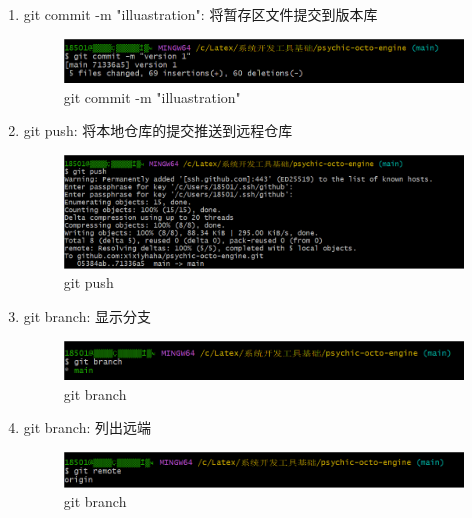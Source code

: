 \documentclass{ctexart}
\begin{document}
\begin{enumerate}
  \vspace{-5pt}\item git commit -m "illuastration": 将暂存区文件提交到版本库
   \begin{figure}[H]
      \centering
      \includegraphics[width=18cm]{b471598ff20a910bccfd0abfd541bcef.png}
      \caption{git commit -m "illuastration"}
      \label{fig:17}
  \end{figure}

  \vspace{-5pt}\item git push: 将本地仓库的提交推送到远程仓库
   \begin{figure}[H]
      \centering
      \includegraphics[width=16cm]{4ffbfc1437dd891758904bd297c85946.png}
      \caption{git push}
      \label{fig:18}
  \end{figure}
  \vspace{-5pt}\item git branch: 显示分支
   \begin{figure}[H]
      \centering
      \includegraphics[width=18cm]{3671d9519684f17b9b96eaeca6db42e6.png}
      \caption{git branch}
      \label{fig:19}
  \end{figure}
  \vspace{-5pt}\item git branch: 列出远端
   \begin{figure}[H]
      \centering
      \includegraphics[width=16cm]{58a7eea9feb1c6073c85548618e7cef4.png}
      \caption{git branch}
      \label{fig:110}
  \end{figure}

\end{enumerate}
\end{document}
